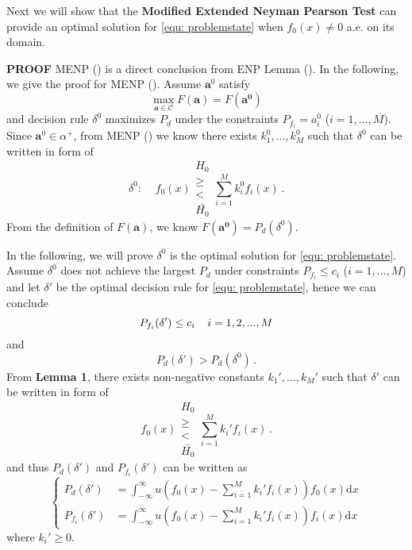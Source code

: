 Next we will show that the \textbf{Modified Extended Neyman Pearson Test} can provide an optimal solution for \eqref{equ: problemstate} when $f_0(x) \neq 0$ a.e. on its domain.

\textbf{PROOF}
MENP () is a direct conclusion from ENP Lemma (). In the following,  we give the proof for MENP (). Assume $\mathbf{a}^0$ satisfy
\begin{equation}
\label{a0}
\max_{\mathbf{a}\in\mathcal{C}} F(\mathbf{a}) = F(\mathbf{a^0})
\end{equation}
and decision rule $\delta^0$ maximizes $P_d$ under the constraints $P_{f_i} = a^0_i$ ($i = 1, ..., M$). Since $\mathbf{a}^0 \in \alpha^+$, from MENP () we know there exists $k_1^0, ..., k_M^0$ such that $\delta^0$ can be written in form of 
\[
\delta^0:\;\;\;\;f_0(x) \substack{H_0 \\ \geq \\ < \\ \bar{H_0}} \sum_{i=1}^{M}k_i^0f_i(x)\,.
\] 
From the definition of $F(\mathbf{a})$, we know $F(\mathbf{a^0}) = P_d(\delta^0)$.

In the following, we  will prove $\delta^0$ is the optimal solution for \eqref{equ: problemstate}. 
Assume  $\delta^0$ does not achieve the largest $P_d$ under constraints $P_{f_i} \leq c_i$ ($i=1, ..., M$) and let $\delta'$ be the optimal decision rule for \eqref{equ: problemstate}, hence  we can conclude
\begin{equation}
\label{condition 1}
P_{f_i}(\delta') \leq c_i\;\;\;\;i=1, 2, ..., M\\
\end{equation}
and
\begin{equation}
\label{condition 2}
P_{d}(\delta') > P_d(\delta^0)\,.
\end{equation}
From \textbf{Lemma 1}, there exists non-negative constants $k_1', ..., k_M'$ such that $\delta'$ can be written in form of 
\begin{equation}
f_0(x) \substack{H_0 \\ \geq \\ < \\ \bar{H_0}} \sum_{i=1}^{M}k_i'f_i(x)\,.
\label{2015feb20a1}
\end{equation}
and thus $P_d(\delta')$ and $P_{f_i}(\delta')$ can be written as
\begin{equation}
\begin{cases}
\label{TEMP10}
P_{d}(\delta') &= \int_{-\infty}^{\infty} u(f_0(x) - \sum_{i=1}^{M}k_i'f_i(x)) f_0(x) \mathrm{d}x\\
P_{f_i}(\delta') &= \int_{-\infty}^{\infty} u(f_0(x) - \sum_{i=1}^{M}k_i'f_i(x)) f_i(x) \mathrm{d}x
\end{cases}
\end{equation}
where $k_i' \geq 0$.

